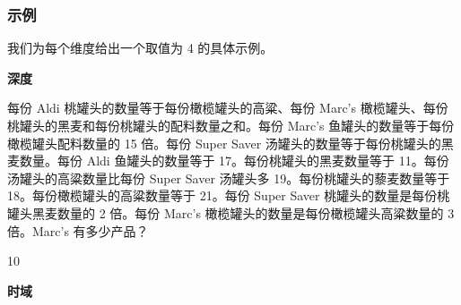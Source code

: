 \subsubsection{示例}
\label{ap:masbench_example}

我们为每个维度给出一个取值为 4 的具体示例。

\textbf{深度}

\begin{systemprompt}[title={问题}]
每份 Aldi 桃罐头的数量等于每份橄榄罐头的高粱、每份 Marc's 橄榄罐头、每份桃罐头的黑麦和每份桃罐头的配料数量之和。每份 Marc's 鱼罐头的数量等于每份橄榄罐头配料数量的 15 倍。每份 Super Saver 汤罐头的数量等于每份桃罐头的黑麦数量。每份 Aldi 鱼罐头的数量等于 17。每份桃罐头的黑麦数量等于 11。每份汤罐头的高粱数量比每份 Super Saver 汤罐头多 19。每份桃罐头的藜麦数量等于 18。每份橄榄罐头的高粱数量等于 21。每份 Super Saver 桃罐头的数量是每份桃罐头黑麦数量的 2 倍。每份 Marc's 橄榄罐头的数量是每份橄榄罐头高粱数量的 3 倍。Marc's 有多少产品？
\end{systemprompt}
\begin{userprompt}[title={答案}]
10
\end{userprompt}

\textbf{时域}



